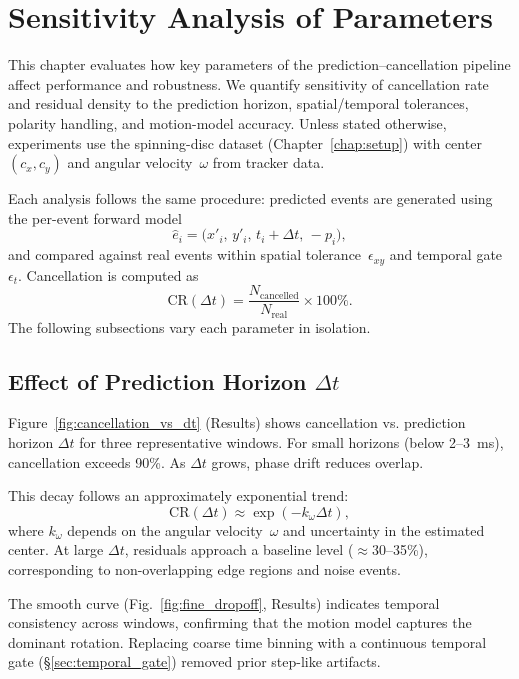 \chapter{Sensitivity Analysis of Parameters}
\label{chap:metrics}

This chapter evaluates how key parameters of the prediction–cancellation pipeline affect performance and robustness. We quantify sensitivity of cancellation rate and residual density to the prediction horizon, spatial/temporal tolerances, polarity handling, and motion-model accuracy. Unless stated otherwise, experiments use the spinning-disc dataset (Chapter~\ref{chap:setup}) with center \((c_x, c_y)\) and angular velocity~\(\omega\) from tracker data.

Each analysis follows the same procedure: predicted events are generated using the per-event forward model
\[
\hat{e}_i = \big(x'_i,\, y'_i,\, t_i + \Delta t,\, -p_i \big),
\]
and compared against real events within spatial tolerance~\(\epsilon_{xy}\) and temporal gate~\(\epsilon_t\). Cancellation is computed as
\[
\text{CR}(\Delta t) = \frac{N_{\text{cancelled}}}{N_{\text{real}}} \times 100\%.
\]
The following subsections vary each parameter in isolation.

\section{Effect of Prediction Horizon \(\Delta t\)}
\label{sec:dt_sensitivity}

Figure~\ref{fig:cancellation_vs_dt} (Results) shows cancellation vs. prediction horizon \(\Delta t\) for three representative windows. For small horizons (below 2–3~ms), cancellation exceeds 90\%. As \(\Delta t\) grows, phase drift reduces overlap.

This decay follows an approximately exponential trend:
\[
\text{CR}(\Delta t) \approx \exp\!\left(-k_{\omega}\Delta t\right),
\]
where \(k_{\omega}\) depends on the angular velocity~\(\omega\) and uncertainty in the estimated center.
At large \(\Delta t\), residuals approach a baseline level (\(\approx\)30–35\%), corresponding to non-overlapping edge regions and noise events.

The smooth curve (Fig.~\ref{fig:fine_dropoff}, Results) indicates temporal consistency across windows, confirming that the motion model captures the dominant rotation. Replacing coarse time binning with a continuous temporal gate (\S\ref{sec:temporal_gate}) removed prior step-like artifacts.

